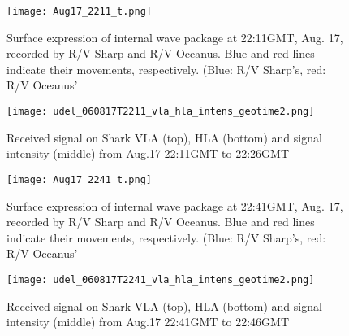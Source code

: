 \begin{figure}[H]
  \centering
  \texttt{[image: Aug17\_2211\_t.png]}
  \caption{Surface expression of internal wave package at 22:11GMT, Aug. 17, recorded by R/V Sharp and R/V Oceanus. Blue and red lines indicate their movements, respectively. (Blue: R/V Sharp's, red: R/V Oceanus'}\label{fig:r2130_r}
\end{figure}


\begin{figure}[H]
  \centering
  \texttt{[image: udel\_060817T2211\_vla\_hla\_intens\_geotime2.png]}
  \caption{Received signal on Shark VLA (top), HLA (bottom) and signal intensity (middle) from Aug.17 22:11GMT to 22:26GMT }\label{fig:a2130}
\end{figure}



\begin{figure}[H]
  \centering
  \texttt{[image: Aug17\_2241\_t.png]}
  \caption{Surface expression of internal wave package at 22:41GMT, Aug. 17, recorded by R/V Sharp and R/V Oceanus. Blue and red lines indicate their movements, respectively. (Blue: R/V Sharp's, red: R/V Oceanus'}\label{fig:r2130_r}
\end{figure}


\begin{figure}[H]
  \centering
  \texttt{[image: udel\_060817T2241\_vla\_hla\_intens\_geotime2.png]}
  \caption{Received signal on Shark VLA (top), HLA (bottom) and signal intensity (middle) from Aug.17 22:41GMT to 22:46GMT }\label{fig:a2130}
\end{figure}

